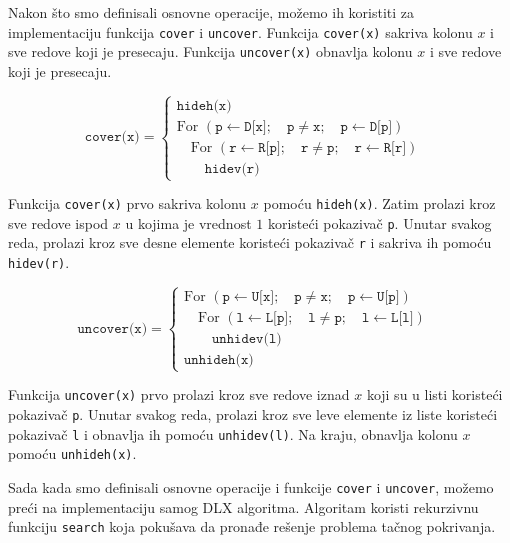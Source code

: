 \documentclass[a4paper]{article}
\begin{document}
{  Nakon što smo definisali osnovne operacije, možemo ih koristiti za implementaciju funkcija \texttt{cover} i
  \texttt{uncover}. Funkcija \texttt{cover(x)} sakriva kolonu \(x\) i sve redove koji je presecaju. Funkcija
  \texttt{uncover(x)} obnavlja kolonu \(x\) i sve redove koji je presecaju.

  \[
  \texttt{cover(x)} =
  \begin{cases}
  \texttt{hideh(x)} & \\
  \text{For } (\texttt{p} \gets \texttt{D[x]}; \quad \texttt{p} \neq \texttt{x}; \quad \texttt{p} \gets \texttt{D[p]}) & \\
  \quad \text{For } (\texttt{r} \gets \texttt{R[p]}; \quad \texttt{r} \neq \texttt{p}; \quad \texttt{r} \gets \texttt{R[r]}) & \\
  \quad \quad \texttt{hidev(r)} &
  \end{cases}
  \]
  
  Funkcija \texttt{cover(x)} prvo sakriva kolonu \(x\) pomoću \texttt{hideh(x)}. Zatim prolazi kroz sve redove ispod
  \(x\) u kojima je vrednost \(1\) koristeći pokazivač \texttt{p}. Unutar svakog reda, prolazi kroz sve desne elemente koristeći pokazivač
  \texttt{r} i sakriva ih pomoću \texttt{hidev(r)}.
  
  \[
  \texttt{uncover(x)} =
  \begin{cases}
  \text{For } (\texttt{p} \gets \texttt{U[x]}; \quad \texttt{p} \neq \texttt{x}; \quad \texttt{p} \gets \texttt{U[p]}) & \\
  \quad \text{For } (\texttt{l} \gets \texttt{L[p]}; \quad \texttt{l} \neq \texttt{p}; \quad \texttt{l} \gets \texttt{L[l]}) & \\
  \quad \quad \texttt{unhidev(l)} & \\
  \texttt{unhideh(x)} &
  \end{cases}
  \]
  
  Funkcija \texttt{uncover(x)} prvo prolazi kroz sve redove iznad \(x\) koji su u listi koristeći pokazivač \texttt{p}. Unutar svakog reda, prolazi kroz sve leve elemente iz liste koristeći pokazivač \texttt{l} i obnavlja ih pomoću \texttt{unhidev(l)}. Na kraju, obnavlja kolonu \(x\) pomoću \texttt{unhideh(x)}.

  Sada kada smo definisali osnovne operacije i funkcije \texttt{cover} i \texttt{uncover}, možemo preći na implementaciju samog DLX algoritma. Algoritam koristi rekurzivnu funkciju \texttt{search} koja pokušava da pronađe rešenje problema tačnog pokrivanja.

}
\end{document}
